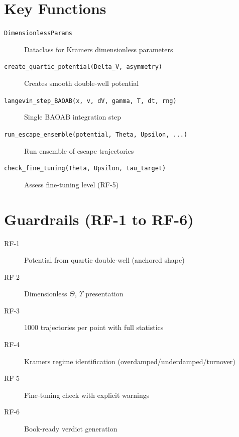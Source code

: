 \section{Key Functions}

\begin{description}
    \item[\texttt{DimensionlessParams}]
        Dataclass for Kramers dimensionless parameters
    \item[\texttt{create\_quartic\_potential(Delta\_V, asymmetry)}]
        Creates smooth double-well potential
    \item[\texttt{langevin\_step\_BAOAB(x, v, dV, gamma, T, dt, rng)}]
        Single BAOAB integration step
    \item[\texttt{run\_escape\_ensemble(potential, Theta, Upsilon, ...)}]
        Run ensemble of escape trajectories
    \item[\texttt{check\_fine\_tuning(Theta, Upsilon, tau\_target)}]
        Assess fine-tuning level (RF-5)
\end{description}

\section{Guardrails (RF-1 to RF-6)}

\begin{description}
    \item[RF-1] Potential from quartic double-well (anchored shape)
    \item[RF-2] Dimensionless $\Theta$, $\Upsilon$ presentation
    \item[RF-3] 1000 trajectories per point with full statistics
    \item[RF-4] Kramers regime identification (overdamped/underdamped/turnover)
    \item[RF-5] Fine-tuning check with explicit warnings
    \item[RF-6] Book-ready verdict generation
\end{description}

